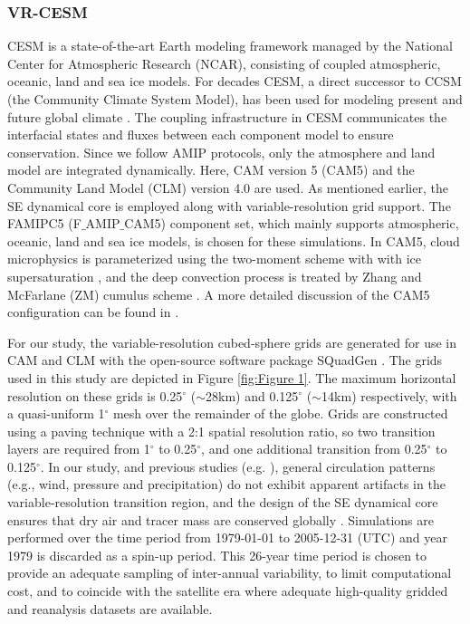 \documentclass[draft,ms]{agutex}   %
\begin{document}
\begin{article}
\subsubsection{VR-CESM}

CESM is a state-of-the-art Earth modeling framework managed by the National Center for Atmospheric Research (NCAR), consisting of coupled atmospheric, oceanic, land and sea ice models.  For decades CESM, a direct successor to CCSM (the Community Climate System Model), has been used for modeling present and future global climate \citep{neale2010description, hurrell2013community}.  The coupling infrastructure in CESM communicates the interfacial states and fluxes between each component model to ensure conservation. Since we follow AMIP protocols, only the atmosphere and land model are integrated dynamically. Here, CAM version 5 (CAM5) \citep{CAM5Tech} and the Community Land Model (CLM) version 4.0 \citep{CLM40Tech} are used. As mentioned earlier, the SE dynamical core is employed along with variable-resolution grid support. The FAMIPC5 (F$\_$AMIP$\_$CAM5) component set, which mainly supports atmospheric, oceanic, land and sea ice models, is chosen for these simulations. In CAM5, cloud microphysics is parameterized using the two-moment scheme with with ice supersaturation \citep{ morrison2008new, gettelman2008new}, and the deep convection process is treated by Zhang and McFarlane (ZM) cumulus scheme \citep{zhang1995sensitivity}. A more detailed discussion of the CAM5 configuration can be found in \citep{neale2010description}.

For our study, the variable-resolution cubed-sphere grids are generated for use in CAM and CLM with the open-source software package SQuadGen \citep{ullrich2014squadgen,guba2014spectral}. The grids used in this study are depicted in Figure \ref{fig:Figure 1}.  The maximum horizontal resolution on these grids is 0.25$^\circ$ ($\sim$28km) and 0.125$^\circ$ ($\sim$14km) respectively, with a quasi-uniform 1$^\circ$ mesh over the remainder of the globe. Grids are constructed using a paving technique with a 2:1 spatial resolution ratio, so two transition layers are required from 1$^\circ$ to 0.25$^\circ$, and one additional transition from 0.25$^\circ$ to 0.125$^\circ$. In our study, and previous studies (e.g. \cite{zarzycki2015effects}), general circulation patterns (e.g., wind, pressure and precipitation) do not exhibit apparent artifacts in the variable-resolution transition region, and the design of the SE dynamical core ensures that dry air and tracer mass are conserved globally \citep{taylor2010compatible}. Simulations are performed over the time period from 1979-01-01 to 2005-12-31 (UTC) and year 1979 is discarded as a spin-up period. This 26-year time period is chosen to provide an adequate sampling of inter-annual variability, to limit computational cost, and to coincide with the satellite era where adequate high-quality gridded and reanalysis datasets are available.


\end{article}
\end{document}

